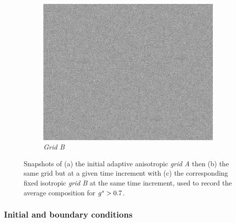 \begin{figure}[H]
\begin{subfigure}[t]{0.3\textwidth}
    \label{fig:gridA}
  \end{subfigure}
  \begin{subfigure}[t]{0.3\textwidth}
    \centering
    \includegraphics[width=\textwidth]{Chapter5/Graphics/2d/GridB.png}
    \caption{\emph{Grid B}}
    \label{fig:gridB}
  \end{subfigure}
\caption{Snapshots of (a) the initial adaptive anisotropic \emph{grid A} then (b) the same grid but at 
a given time increment with (c) the corresponding fixed isotropic \emph{grid B} at the same time increment, 
used to record the average composition for ${g^s}>0.7$.}
\label{fig:smacs_grids}
\end{figure}



\subsubsection{Initial and boundary conditions}


